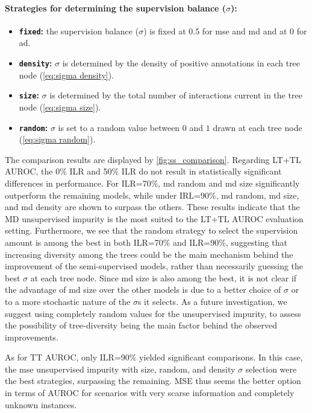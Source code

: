 \paragraph*{Strategies for determining the supervision balance ($\sigma$):}
\begin{itemize}
    \item \textbf{\texttt{fixed}:} the supervision balance ($\sigma$) is fixed at $0.5$ for mse and md and at $0$ for ad.
    \item \textbf{\texttt{density}:} $\sigma$ is determined by the density of positive annotations in each tree node (\autoref{eq:sigma density}). 
    \item \textbf{\texttt{size}:} $\sigma$ is determined by the total number of interactions current in the tree node (\autoref{eq:sigma size}).
    \item \textbf{\texttt{random}:} $\sigma$ is set to a random value between $0$ and $1$ drawn at each tree node (\autoref{eq:sigma random}).
\end{itemize}

The comparison results are displayed by \autoref{fig:ss_comparison}.
%
Regarding LT+TL AUROC, the 0\% ILR and 50\% ILR do not result in statistically significant differences in performance. For ILR=70\%, md random and md size significantly outperform the remaining models, while under IRL=90\%, md random, md size, and md density are shown to surpass the others. These results indicate that the MD unsupervised impurity is the most suited to the LT+TL AUROC evaluation setting. Furthermore, we see that the random strategy to select the supervision amount %
is among the best in both ILR=70\% and ILR=90\%, suggesting that increasing diversity among the trees could be the main mechanism behind the improvement of the semi-supervised models, rather than necessarily guessing the best $\sigma$ at each tree node. Since md size is also among the best, it is not clear if the advantage of md size over the other models is due to a better choice of $\sigma$ or to a more stochastic nature of the $\sigma$s it selects.
%
%
As a future investigation, we suggest using completely random values for the unsupervised impurity, to assess the possibility of tree-diversity being the main factor behind the observed improvements.

As for TT AUROC, only ILR=90\% yielded significant comparisons. In this case, the mse unsupervised impurity with size, random, and density $\sigma$ selection were the best strategies, surpassing the remaining. MSE thus seems the better option in terms of AUROC for scenarios with very scarse information and completely unknown instances.

